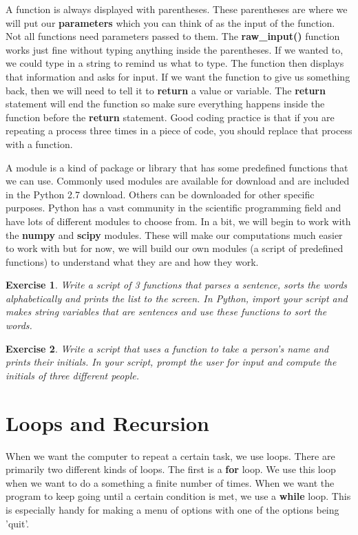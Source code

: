 \documentclass[12pt]{amsart}
\newtheorem{quest}{Exercise}
\theoremstyle{definition}
\begin{document}
A function is always displayed with parentheses. These parentheses are where we will put our \textbf{parameters} which you can think of as the input of the function. Not all functions need parameters passed to them. The \textbf{raw\_input()} function works just fine without typing anything inside the parentheses. If we wanted to, we could type in a string to remind us what to type. The function then displays that information and asks for input. If we want the function to give us something back, then we will need to tell it to \textbf{return} a value or variable. The \textbf{return} statement will end the function so make sure everything happens inside the function before the \textbf{return} statement. Good coding practice is that if you are repeating a process three times in a piece of code, you should replace that process with a function.

A module is a kind of package or library that has some predefined functions that we can use. Commonly used modules are available for download and are included in the Python 2.7 download. Others can be downloaded for other specific purposes. Python has a vast community in the scientific programming field and have lots of different modules to choose from. In a bit, we will begin to work with the \textbf{numpy} and \textbf{scipy} modules. These will make our computations much easier to work with but for now, we will build our own modules (a script of predefined functions) to understand what they are and how they work.

\begin{quest}
Write a script of 3 functions that parses a sentence, sorts the words alphabetically and prints the list to the screen. In Python, import your script and makes string variables that are sentences and use these functions to sort the words.
\end{quest}
\begin{quest}
Write a script that uses a function to take a person's name and prints their initials. In your script, prompt the user for input and compute the initials of three different people.
\end{quest}

\section{Loops and Recursion}%

When we want the computer to repeat a certain task, we use loops. There are primarily two different kinds of loops. The first is a \textbf{for} loop. We use this loop when we want to do a something a finite number of times. When we want the program to keep going until a certain condition is met, we use a \textbf{while} loop. This is especially handy for making a menu of options with one of the options being 'quit'.
\end{document}

